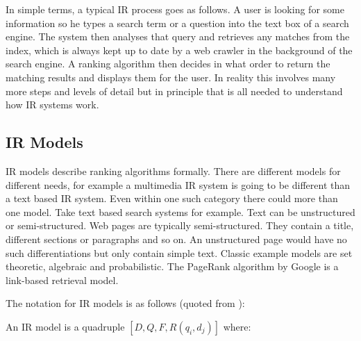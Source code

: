 In simple terms, a typical IR process goes as follows. A user is looking for some information so he types a search term or a question into the text box of a search engine. The system then analyses that query and retrieves any matches from the index, which is always kept up to date by a web crawler in the background of the search engine. A ranking algorithm then decides in what order to return the matching results and displays them for the user. In reality this involves many more steps and levels of detail but in principle that is all needed to understand how IR systems work.

\subsection{IR Models}

IR models describe ranking algorithms formally. There are different models for different needs, for example a multimedia IR system is going to be different than a text based IR system. Even within one such category there could more than one model. Take text based search systems for example. Text can be unstructured or semi-structured. Web pages are typically semi-structured. They contain a title, different sections or paragraphs and so on. An unstructured page would have no such differentiations but only contain simple text.  Classic example models are set theoretic, algebraic and probabilistic. The PageRank algorithm by Google is a link-based retrieval model.

The notation for IR models is as follows (quoted from \citep[p.58]{Baeza-Yates2011}):


An IR model is a quadruple $[D,Q,F,R\left ( q_{i}, d_{j} \right )]$ where:\\
 \\
 \\
 \\
\\
 \\

